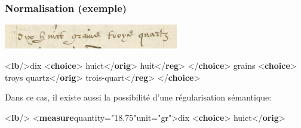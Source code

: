 \documentclass[]{beamer}\makeatletter
\begin{document}
\begin{frame}[fragile]
\frametitle{Normalisation (exemple)}\par
      \includegraphics[width=3in,]{../Graphics/Ms629_p05-dtl-2.png}     
\bgroup\ttfamily\fontsize{6.5pt}{7pt}\selectfont\par
\begin{exampleblock}{}
\noindent\ttfamily\mbox{}{\color{blue1}<\textbf{lb}/>}dix {\color{blue1}<\textbf{choice}>}\mbox{}\newline 
{}huict{\color{blue1}</\textbf{orig}>}\mbox{}\newline 
{}huit{\color{blue1}</\textbf{reg}>}\mbox{}\newline 
{\color{blue1}</\textbf{choice}>}\mbox{}\newline 
 grains \mbox{}\newline 
{\color{blue1}<\textbf{choice}>}\mbox{}\newline 
{}troys quartz{\color{blue1}</\textbf{orig}>}\mbox{}\newline 
{}trois-quart{\color{blue1}</\textbf{reg}>}\mbox{}\newline 
{\color{blue1}</\textbf{choice}>}
\end{exampleblock}
\par\egroup
  \par
Dans ce cas, il existe aussi la possibilité d'une régularisation sémantique:      
\bgroup\ttfamily\fontsize{6.5pt}{7pt}\selectfont\par
\begin{exampleblock}{}
\noindent\ttfamily\mbox{}{\color{blue1}<\textbf{lb}/>}\mbox{}\newline 
{\color{blue1}<\textbf{measure}\hspace*{6pt}quantity="{\color{blue2}18.75}"\hspace*{6pt}unit="{\color{blue2}gr}">}dix {\color{blue1}<\textbf{choice}>}\mbox{}\newline 
\hspace*{6pt}huict{\color{blue1}</\textbf{orig}>}\mbox{}\newline 

\end{exampleblock}
\end{frame}
\end{document}
